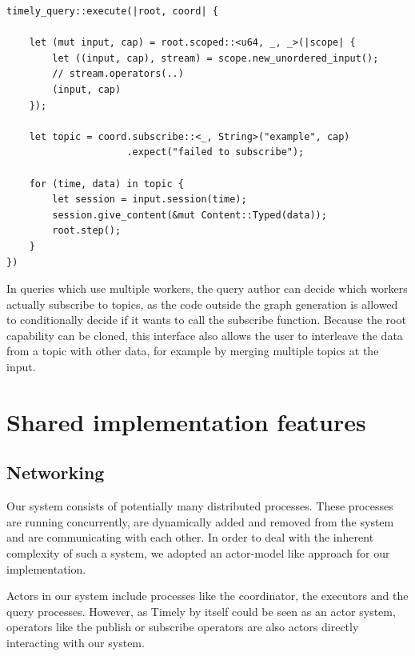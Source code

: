 \begin{lstlisting}[caption={[Typical use of the subscription handle]
Typical use of the subscription handle. This query subscribes to a single topic of
strings, with \lstinline{u64} being the type of the timestamps.
}]
timely_query::execute(|root, coord| {

    let (mut input, cap) = root.scoped::<u64, _, _>(|scope| {
        let ((input, cap), stream) = scope.new_unordered_input();
        // stream.operators(..)
        (input, cap)
    });

    let topic = coord.subscribe::<_, String>("example", cap)
                     .expect("failed to subscribe");

    for (time, data) in topic {
        let session = input.session(time);
        session.give_content(&mut Content::Typed(data));
        root.step();
    }
})
\end{lstlisting}

In queries which use multiple workers, the query author can decide which workers
actually subscribe to topics, as the code outside the graph generation is allowed
to conditionally decide if it wants to call the subscribe function. Because
the root capability can be cloned, this interface also allows the user to
interleave the data from a topic with other data, for example by merging
multiple topics at the input.

\section{Shared implementation features}

\subsection{Networking}

Our system consists of potentially many distributed processes. These processes
are running concurrently, are dynamically added and removed from the system
and are communicating with each other. In order to deal with the inherent
complexity of such a system, we adopted an actor-model like approach for our
implementation.

Actors in our system include processes like the coordinator, the executors 
and the query processes. However, as Timely by itself could be seen as an
actor system, operators like the publish or subscribe operators are also actors
directly interacting with our system.

